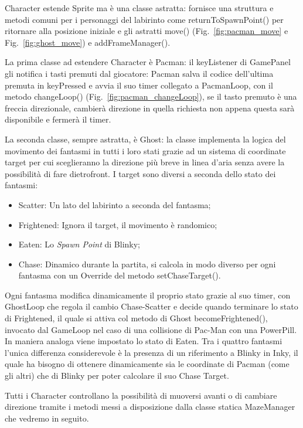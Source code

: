 \documentclass[12pt,a4paper]{report}
\begin{document}
Character estende Sprite ma è una classe astratta: fornisce una struttura e metodi comuni per i personaggi del labirinto come returnToSpawnPoint() per ritornare alla posizione iniziale e gli astratti move() (Fig.~\ref{fig:pacman_move} e Fig.~\ref{fig:ghost_move})  e addFrameManager().

La prima classe ad estendere Character è Pacman: il keyListener di GamePanel gli notifica i tasti premuti dal giocatore: Pacman salva il codice dell’ultima premuta in keyPressed e avvia il suo timer collegato a PacmanLoop, con il metodo changeLoop() (Fig.~\ref{fig:pacman_changeLoop}), se il tasto premuto è una freccia direzionale, cambierà direzione in quella richiesta non appena questa sarà disponibile e fermerà il timer.

La seconda classe, sempre astratta, è Ghost: la classe implementa la logica del movimento dei fantasmi in tutti i loro stati grazie ad un sistema di coordinate target per cui sceglieranno la direzione più breve in linea d’aria senza avere la possibilità di fare dietrofront. I target sono diversi a seconda dello stato dei fantasmi:
\begin{itemize}
 \item Scatter: Un lato del labirinto a seconda del fantasma;
 \item Frightened: Ignora il target, il movimento è randomico;
 \item Eaten: Lo \textit{Spawn Point} di Blinky;
 \item Chase: Dinamico durante la partita, si calcola in modo diverso per ogni fantasma con un Override del metodo setChaseTarget().
\end{itemize}
Ogni fantasma modifica dinamicamente il proprio stato grazie al suo timer, con GhostLoop che regola il cambio Chase-Scatter e decide quando terminare lo stato di Frightened, il quale si attiva col metodo di Ghost becomeFrightened(), invocato dal GameLoop nel caso di una collisione di Pac-Man con una PowerPill. In maniera analoga viene impostato lo stato di Eaten.
Tra i quattro fantasmi l’unica differenza considerevole è la presenza di un riferimento a Blinky in Inky, il quale ha bisogno di ottenere dinamicamente sia le coordinate di Pacman (come gli altri) che di Blinky per poter calcolare il suo Chase Target.

Tutti i Character controllano la possibilità di muoversi avanti o di cambiare direzione tramite i metodi messi a disposizione dalla classe statica MazeManager che vedremo in seguito.
\end{document}
